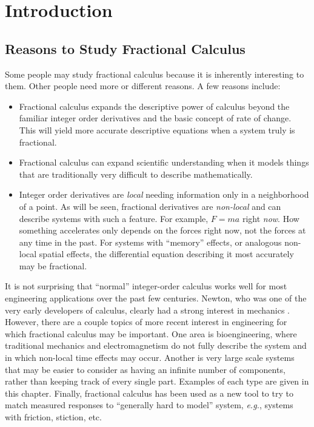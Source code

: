 \chapter{Introduction}

\section{Reasons to Study Fractional Calculus}
Some people may study fractional calculus because it is inherently interesting to them. Other people need more or different reasons. A few reasons include:
\begin{itemize}
  \item Fractional calculus expands the descriptive power of calculus beyond the familiar integer order derivatives and the basic concept of rate of change. This will yield more accurate descriptive equations when a system truly is fractional.
  \item Fractional calculus can expand scientific understanding when it models things that are traditionally very difficult to describe mathematically.
  \item Integer order derivatives are \emph{local} needing information only in a neighborhood of a point. As will be seen, fractional derivatives are \emph{non-local} and can describe systems with such a feature. For example, $F=ma$ right \emph{now}. How something accelerates only depends on the forces right now, not the forces at any time in the past. For systems with ``memory'' effects, or analogous non-local spatial effects, the differential equation describing it most accurately may be fractional.
\end{itemize}

It is not surprising that ``normal'' integer-order calculus works well for most engineering applications over the past few centuries. Newton, who was one of the very early developers of calculus, clearly had a strong interest in mechanics \cite{principia}. However, there are a couple topics of more recent interest in engineering for which fractional calculus may be important. One area is bioengineering, where traditional mechanics and electromagnetism do not fully describe the system and in which non-local time effects may occur. Another is very large scale systems that may be easier to consider as having an infinite number of components, rather than keeping track of every single part. Examples of each type are given in this chapter.  Finally, fractional calculus has been used as a new tool to try to match measured responses to ``generally hard to model'' system, \textit{e.g.}, systems with friction, stiction, etc. 

